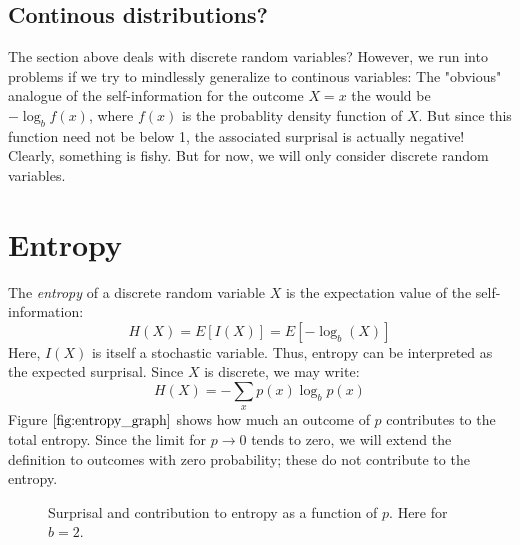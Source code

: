 \documentclass[12pt, a4paper]{article}
\numberwithin{equation}{section}
\begin{document}
\subsection{Continous distributions?}
The section above deals with discrete random variables? However, we run into problems if we try to mindlessly generalize to continous variables: The "obvious" analogue of the self-information for the outcome $X=x$ the would be $-\log_b f(x)$, where $f(x)$ is the probablity density function of $X$. But since this function need not be below 1, the associated surprisal is actually negative! Clearly, something is fishy. But for now, we will only consider discrete random variables.

\section{Entropy}
The \textit{entropy} of a discrete random variable $X$ is the expectation value of the self-information:
\begin{equation}
H(X)=E[I(X)]=E[-\log_b(X)]
\end{equation}
Here, $I(X)$ is itself a stochastic variable. Thus, entropy can be interpreted as the expected surprisal. Since $X$ is discrete, we may write:
\begin{equation}
H(X)=-\sum_x p(x)\log_b p(x)
\end{equation}
Figure $\ref{fig:entropy_graph}$ shows how much an outcome of $p$ contributes to the total entropy. Since the limit for $p\rightarrow 0$ tends to zero, we will extend the definition to outcomes with zero probability; these do not contribute to the entropy.

\begin{figure}
\centering
{}
\caption{Surprisal and contribution to entropy as a function of $p$. Here for $b=2$.}
\label{fig:entropy_graph}
\end{figure}
\end{document}
